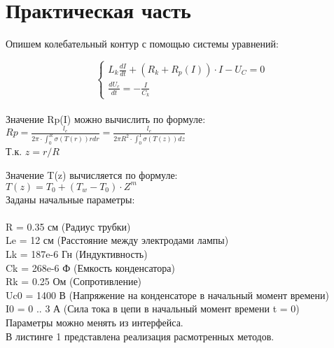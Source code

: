 \documentclass[a4paper, 14pt]{article}
\begin{document}
	\section{Практическая часть}
	
	Опишем колебательный контур с помощью системы уравнений:
	
	\begin{equation*}
\begin{cases} L_k \frac{dI}{dt} + (R_k + R_p(I)) \cdot I - U_C = 0 
\\ \frac{dU_c}{dt} = - \frac{I}{C_k}
\end{cases}
\end{equation*}\\
	
	Значение Rp(I) можно вычислить по формуле:\\
	
$Rp = \frac{l_e}{2 \pi \cdot \int_0^R \sigma(T(r))rdr} = \frac{l_e}{2 \pi R^2 \cdot \int_0^1 \sigma(T(z))dz}$\\

Т.к. $z=r/R$

Значение T(z) вычисляется по формуле:\\

$T(z) = T_0 + (T_w - T_0) \cdot Z^m$\\

Заданы начальные параметры:\\ \\
R = 0.35 см (Радиус трубки)\\
Le = 12 см (Расстояние между электродами лампы)\\
Lk = 187e-6 Гн (Индуктивность)\\
Ck = 268e-6 Ф (Емкость конденсатора)\\
Rk = 0.25 Ом (Сопротивление)\\
Uc0 = 1400 В (Напряжение на конденсаторе в начальный момент времени)\\
I0 = 0 .. 3 А (Сила тока в цепи в начальный момент времени t = 0)\\

Параметры можно менять из интерфейса.\\

	В листинге 1 представлена реализация расмотренных методов.
	
\end{document}
